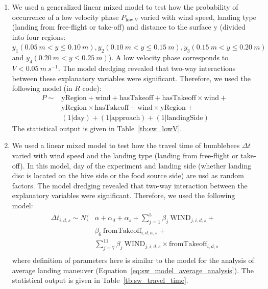 \begin{enumerate}
	\item We used a generalized linear mixed model to test how the probability of occurrence of a low velocity phase $P_{\textrm{low }V}$  varied with wind speed, landing type (landing from free-flight or take-off) and distance to the surface y (divided into four regions: $y_1 (0.05~m<y\le0.10~m), y_2 (0.10~m<y\le0.15~m), y_3 (0.15~m<y\le0.20~m)$ and $y_4 (0.20~m<y\le0.25~m)$). A low velocity phase corresponds to $V < 0.05~m~s^{-1}$. The model dredging revealed that two-way interactions between these explanatory variables were significant. Therefore, we used the following model (in $R$ code):
	\begin{equation}
		\label{eq:sw_lowV}
		\begin{array}{lll}
			\!\!\!\!\!\! P \sim \!\!\!\!\! 
			& \textrm{yRegion} + \textrm{wind} + \textrm{hasTakeoff} + \textrm{hasTakeoff} \times \textrm{wind} +\\
			&  \textrm{yRegion} \times \textrm{hasTakeoff} +  \textrm{wind} \times \textrm{yRegion} +\\
			&  (1|\textrm{day})+(1|\textrm{approach})+(1|\textrm{landingSide})
		\end{array}                                          
	\end{equation}
	The statistical output is given in Table~\ref{tb:sw_lowV}.
	
	\item We used a linear mixed model to test how the travel time of bumblebees $\Delta t$ varied with wind speed and the landing type (landing from free-flight or take-off). In this model, day of the experiment and landing side (whether landing disc is located on the hive side or the food source side) are usd as random factors. The model dredging revealed that two-way interaction between the explanatory variables were significant. Therefore, we used the following model:
	\begin{equation}
		\label{eq:sw_tavel_time}
		\begin{array}{lll}
			\Delta t_{i,d,s} \sim N(\!\!\!\!\!
			&\alpha + \alpha_d + \alpha_s + \sum_{j=1}^{5} \beta_j~\textrm{WIND}_{j,i,d,s} + \\
			& \beta_6~\textrm{fromTakeoff}_{i,d,a,s} + \\
			& \sum_{j=7}^{11} \beta_j~\textrm{WIND}_{j,i,d,s} \times \textrm{fromTakeoff}_{i,d,s} \\
		\end{array}                                          
	\end{equation}
	where definition of parameters here is similar to the model for the analysis of average landing maneuver (Equation~\ref{eq:sw_model_average_analysis}). The statistical output is given in Table~\ref{tb:sw_travel_time}.	
\end{enumerate}

